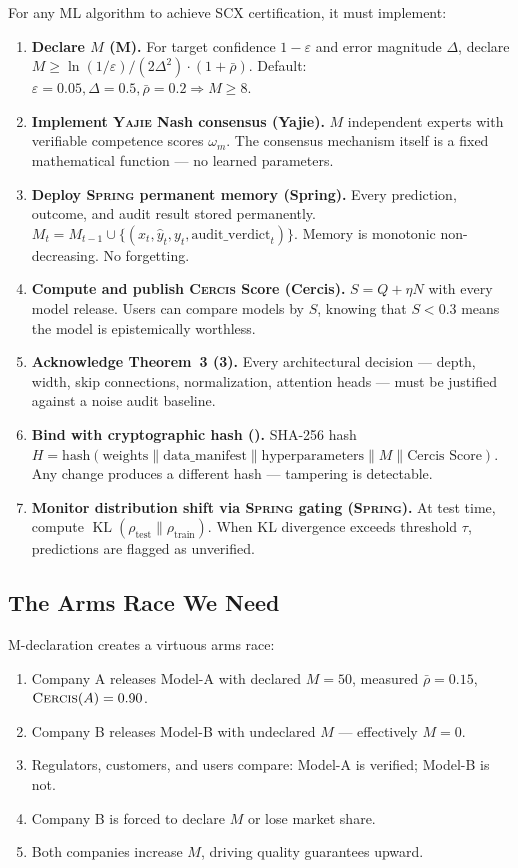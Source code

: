 \documentclass[12pt,a4paper]{article}
\theoremstyle{definition}
\newcommand{\Yajie}{\textsc{Yajie}}
\newcommand{\Spring}{\textsc{Spring}}
\newcommand{\Cercis}{\textsc{Cercis}}
\newcommand{\SCX}{\textsc{SCX}}
\DeclareMathOperator{\KL}{KL}
\begin{document}
For any ML algorithm to achieve \SCX{} certification, it must implement:

\begin{enumerate}[label=\textbf{Requirement \arabic*:}, nosep]
    \item \textbf{Declare $M$ (M).} For target confidence $1-\varepsilon$ and error magnitude $\Delta$, declare $M \ge \ln(1/\varepsilon) / (2\Delta^2) \cdot (1 + \bar{\rho})$. Default: $\varepsilon = 0.05, \Delta = 0.5, \bar{\rho} = 0.2 \Rightarrow M \ge 8$.
    \item \textbf{Implement \Yajie{} Nash consensus (Yajie).} $M$ independent experts with verifiable competence scores $\omega_m$. The consensus mechanism itself is a fixed mathematical function — no learned parameters.
    \item \textbf{Deploy \Spring{} permanent memory (Spring).} Every prediction, outcome, and audit result stored permanently. $M_t = M_{t-1} \cup \{(x_t, \hat{y}_t, y_t, \text{audit\_verdict}_t)\}$. Memory is monotonic non-decreasing. No forgetting.
    \item \textbf{Compute and publish \Cercis{} Score (Cercis).} $S = Q + \eta N$ with every model release. Users can compare models by $S$, knowing that $S < 0.3$ means the model is epistemically worthless.
    \item \textbf{Acknowledge Theorem~3 (3).} Every architectural decision — depth, width, skip connections, normalization, attention heads — must be justified against a noise audit baseline.
    \item \textbf{Bind with cryptographic hash ().} SHA-256 hash $H = \text{hash}(\text{weights} \| \text{data\_manifest} \| \text{hyperparameters} \| M \| \text{Cercis Score})$. Any change produces a different hash — tampering is detectable.
    \item \textbf{Monitor distribution shift via \Spring{} gating (\Spring{}).} At test time, compute $\KL(\rho_{\text{test}} \| \rho_{\text{train}})$. When KL divergence exceeds threshold $\tau$, predictions are flagged as unverified.
\end{enumerate}

\subsection{The Arms Race We Need }

M-declaration creates a virtuous arms race:
\begin{enumerate}[nosep]
    \item Company A releases Model-A with declared $M=50$, measured $\bar{\rho}=0.15$, $\Cercis(A) = 0.90$.
    \item Company B releases Model-B with undeclared $M$ — effectively $M=0$.
    \item Regulators, customers, and users compare: Model-A is verified; Model-B is not.
    \item Company B is forced to declare $M$ or lose market share.
    \item Both companies increase $M$, driving quality guarantees upward.
\end{enumerate}
\end{document}
